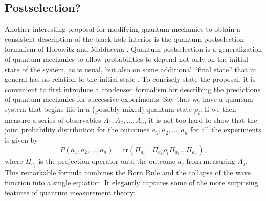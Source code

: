 \documentclass[12pt]{article}
\newcommand{\be}{\begin{equation}}
\newcommand{\ee}{\end{equation}}
\newcommand{\tr}{\mathrm{tr}}
\begin{document}
\subsection{Postselection?}
Another interesting proposal for modifying quantum mechanics to obtain a consistent description of the black hole interior is the quantum postselection formalism of Horowitz and Maldacena \cite{Horowitz:2003he}.  Quantum postselection is a generalization of quantum mechanics to allow probabilities to depend not only on the initial state of the system, as is usual, but also on some additional ``final state'' that in general has no relation to the initial state \cite{PhysRev.134.B1410}.  To concisely state the proposal, it is convenient to first introduce a condensed formalism for describing the predictions of quantum mechanics for successive experiments.  Say that we have a quantum system that begins life in a (possibly mixed) quantum state $\rho_i$.  If we then measure a series of observables $A_1, A_2, \ldots, A_n$, it is not too hard to show that the joint probability distribution for the outcomes $a_1, a_2,\ldots, a_n$ for all the experiments is given by
\be\label{qmP}
P(a_1,a_2,\ldots,a_n)=\tr \left(\Pi_{a_n} \ldots \Pi_{a_1}\rho_i \Pi_{a_1}\ldots \Pi_{a_n}\right),
\ee
where $\Pi_{a_j}$ is the projection operator onto the outcome $a_j$ from measuring $A_j$.  This remarkable formula combines the Born Rule and the collapse of the wave function into a single equation.  It elegantly captures some of the more surprising features of quantum measurement theory:
\end{document}
